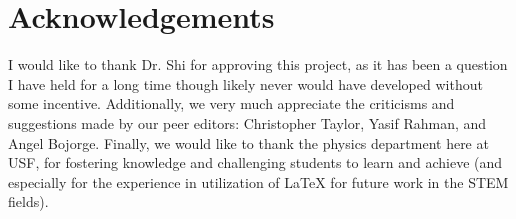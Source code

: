 \section*{Acknowledgements} \label{sec:acknowledgements}
    I would like to thank Dr. Shi for approving this project, as it has been a question I have held for a long time though likely never would have developed without some incentive. Additionally, we very much appreciate the criticisms and suggestions made by our peer editors: Christopher Taylor, Yasif Rahman, and Angel Bojorge. Finally, we would like to thank the physics department here at USF, for fostering knowledge and challenging students to learn and achieve (and especially for the experience in utilization of LaTeX for future work in the STEM fields).